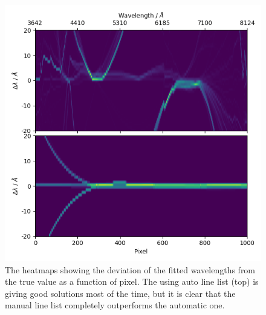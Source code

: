 \documentclass{aa}
\begin{document}
\begin{figure}[h]
    \centering
    \includegraphics[width=\columnwidth]{figure_6_heatmap.png}
    \caption{The heatmaps showing the deviation of the fitted wavelengths from the true value as a function of pixel. The using auto line list (top) is giving good solutions most of the time, but it is clear that the manual line list completely outperforms the automatic one.}
    \label{fig:heatmap}
\end{figure}
\end{document}
